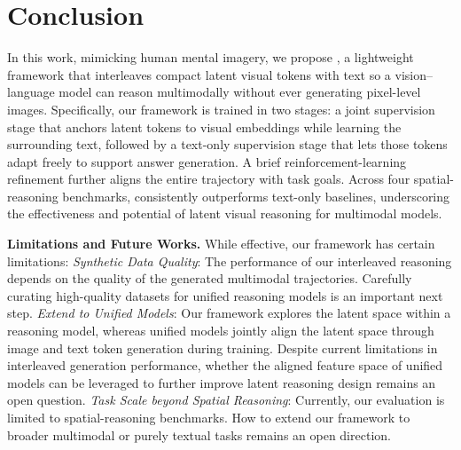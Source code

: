\section{Conclusion} \label{sec:conclusion}
In this work, mimicking human mental imagery, we propose \Model, a lightweight framework that interleaves compact latent visual tokens with text so a vision–language model can reason multimodally without ever generating pixel-level images.
Specifically, our framework is trained in two stages: a joint supervision stage that anchors latent tokens to visual embeddings while learning the surrounding text, followed by a text-only supervision stage that lets those tokens adapt freely to support answer generation.
A brief reinforcement-learning refinement further aligns the entire trajectory with task goals.
Across four spatial-reasoning benchmarks, \Model consistently outperforms text-only baselines, underscoring the effectiveness and potential of latent visual reasoning for multimodal models.

\textbf{Limitations and Future Works.} While effective, our framework has certain limitations: \textit{Synthetic Data Quality}: The performance of our interleaved reasoning depends on the quality of the generated multimodal trajectories. Carefully curating high-quality datasets for unified reasoning models is an important next step. \textit{Extend to Unified Models}: Our framework explores the latent space within a reasoning model, whereas unified models jointly align the latent space through image and text token generation during training. Despite current limitations in interleaved generation performance, whether the aligned feature space of unified models can be leveraged to further improve latent reasoning design remains an open question. \textit{Task Scale beyond Spatial Reasoning}: Currently, our evaluation is limited to spatial-reasoning benchmarks. How to extend our framework to broader multimodal or purely textual tasks remains an open direction.

